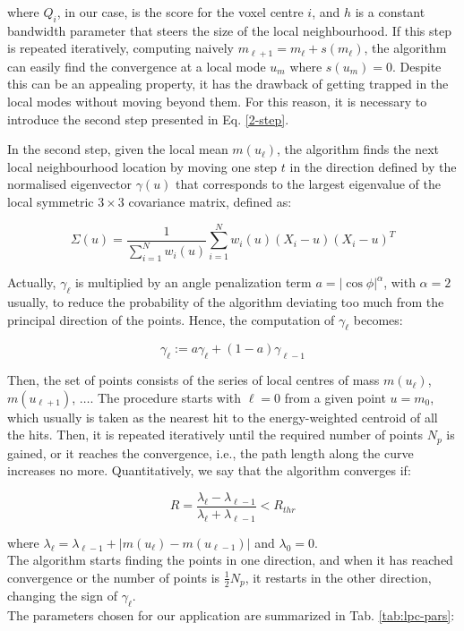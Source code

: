 where $Q_i$, in our case, is the score for the voxel centre $i$, and $h$ is a constant bandwidth parameter that steers the size of the local neighbourhood. 
If this step is repeated iteratively, computing naively $m_{\ell + 1} = m_{\ell} + s(m_{\ell})$, the algorithm can easily find the convergence at a local mode $u_m$ where $s(u_m) = 0$. Despite this can be an appealing property, it has the drawback of getting trapped in the local modes without moving beyond them. For this reason, it is necessary to introduce the second step presented in Eq. \ref{2-step}.

In the second step, given the local mean $m(u_{\ell})$, the \lpc algorithm finds the next local neighbourhood location by moving one step $t$ in the direction defined by the normalised eigenvector $\gamma (u)$ that corresponds to the largest eigenvalue of the local symmetric $3 \times 3$ covariance matrix, defined as:

\begin{equation}
    \Sigma (u) = \frac{1}{\sum^N_{i=1}w_i(u)}\sum^N_{i=1}w_i(u)(X_i - u)(X_i - u)^T
\end{equation}

Actually, $\gamma_{\ell}$ is multiplied by an angle penalization term $a = |{\cos \phi}|^\alpha$, with $\alpha = 2$ usually, to reduce the probability of the algorithm deviating too much from the principal direction of the points. Hence, the computation of $\gamma_{\ell}$ becomes: 

\begin{equation}
    \gamma_{\ell} := a\gamma_{\ell} + (1 - a)\gamma_{\ell - 1}
\end{equation}

Then, the set of \lpc points consists of the series of local centres of mass $m(u_{\ell})$, $m(u_{\ell+1})$, $\dots$. The procedure starts with $\ell = 0$ from a given point $u = m_0$, which usually is taken as the nearest hit to the energy-weighted centroid of all the hits. Then, it is repeated iteratively until the required number of \lpc points $N_p$ is gained, or it reaches the convergence, i.e., the path length along the curve increases no more. Quantitatively, we say that the algorithm converges if: 

\begin{equation}
    R = \frac{\lambda_{\ell} - \lambda_{\ell-1}}{\lambda_{\ell} + \lambda_{\ell-1}} < R_{thr}
\end{equation}

where $\lambda_{\ell} = \lambda_{\ell - 1} + |m(u_{\ell}) - m(u_{\ell -1})|$ and $\lambda_0 = 0$.\\
The algorithm starts finding the \lpc points in one direction, and when it has reached convergence or the number of points is $\frac{1}{2}N_p$, it restarts in the other direction, changing the sign of $\gamma_{\ell}$.\\
The parameters chosen for our application are summarized in Tab. \ref{tab:lpc-pars}:

